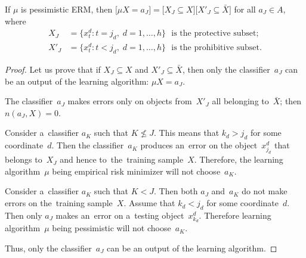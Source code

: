 \documentclass{article}
\newcommand{\X}{\bar X}
\renewcommand{\leq}{\leqslant}
\begin{document}
\begin{lemma}
\label{lem:lattice-exact}
    If $\mu$ is pessimistic ERM, then
    $\bigl[ \mu X {=} a_J \bigr] =
        \bigl[ X_J \subseteq X \bigr]
        \bigl[ X'_J \subseteq \X \bigr]$
    for all $a_J\in A$, where
    \begin{align*}
        X_J &= \bigl\{x_t^d\colon t=j_d,\; d=1,\ldots,h\bigr\}
        \text{~ is the protective subset;}
    \\
        X'_J &= \bigl\{x_t^d\colon t<j_d,\; d=1,\ldots,h\bigr\}
        \text{~ is the prohibitive subset.}
    \end{align*}
\end{lemma}
\begin{proof}
    Let us prove that if $X_J \subseteq X$ and $X'_J \subseteq \X$,
    then only the classifier~$a_J$
    can be an output of the learning algorithm: $\mu X = a_J$.

    The classifier~$a_J$ makes errors
    only on objects from~$X'_J$ all belonging to~$\X$;
    then $n(a_J,X)=0$.

    Consider a~classifier $a_K$ such that $K\not\leq J$.
    This means that $k_d > j_d$ for some coordinate~$d$.
    Then the classifier~$a_K$ produces an~error on the object~$x^d_{j_d}$
    that belongs to~$X_J$ and hence to~the~training sample~$X$.
    Therefore, the learning algorithm~$\mu$ being empirical risk minimizer
    will not choose~$a_K$.

    Consider a~classifier $a_K$ such that $K < J$.
    Then both $a_J$ and~$a_K$ do not make errors on the~training sample~$X$.
    Assume that $k_d < j_d$ for some coordinate~$d$.
    Then only $a_J$ makes an~error  on a~testing object~$x^d_{k_d}$.
    Therefore learning algorithm~$\mu$ being pessimistic
    will not choose~$a_K$.

    Thus, only the classifier~$a_J$ can be an output of the learning algorithm.
\end{proof}
\end{document}
